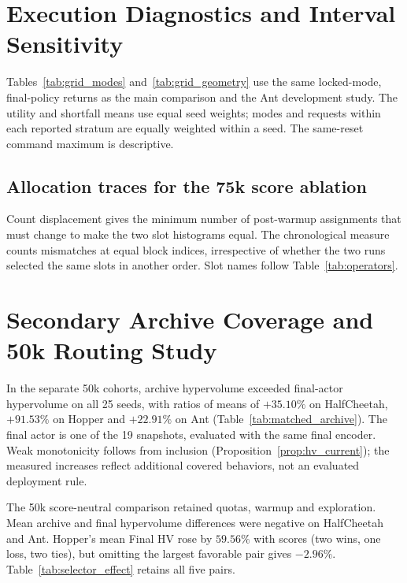 \section{Execution Diagnostics and Interval Sensitivity}
\label{app:review_diagnostics}

Tables~\ref{tab:grid_modes} and~\ref{tab:grid_geometry} use the same
locked-mode, final-policy returns as the main comparison and the Ant
development study. The utility and shortfall means use equal seed
weights; modes and requests within each reported stratum are equally
weighted within a seed. The same-reset command maximum is descriptive.





\FloatBarrier

\subsection{Allocation traces for the 75k score ablation}

Count displacement gives the minimum number of post-warmup assignments
that must change to make the two slot histograms equal. The chronological
measure counts mismatches at equal block indices, irrespective of whether
the two runs selected the same slots in another order. Slot names follow
Table~\ref{tab:operators}.


\FloatBarrier

\section{Secondary Archive Coverage and 50k Routing Study}
\label{sec:archive_quota}

In the separate 50k cohorts, archive hypervolume exceeded final-actor
hypervolume on all 25 seeds, with ratios of means of $+35.10\%$ on
HalfCheetah, $+91.53\%$ on Hopper and $+22.91\%$ on Ant
(Table~\ref{tab:matched_archive}). The final actor is one of the 19
snapshots, evaluated with the same final encoder. Weak monotonicity follows
from inclusion (Proposition~\ref{prop:hv_current}); the measured increases
reflect additional covered behaviors, not an evaluated deployment rule.



The 50k score-neutral comparison retained quotas, warmup and exploration.
Mean archive and final hypervolume differences were negative on HalfCheetah
and Ant. Hopper's mean Final HV rose by $59.56\%$ with scores (two wins,
one loss, two ties), but omitting the largest favorable pair gives
$-2.96\%$. Table~\ref{tab:selector_effect} retains all five pairs.


